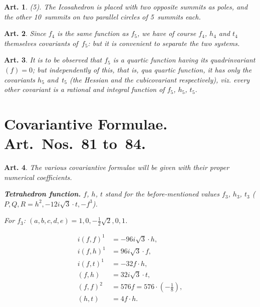 \documentclass[11pt,a4paper]{article}
\theoremstyle{plain}
\newtheorem{art}{Art.}[section]
\begin{document}
\begin{art}
(5). The Icosahedron is placed with two opposite summits as poles, and
the other 10~summits on two parallel circles of 5~summits each.
\end{art}

\begin{art}
Since $f_4$ is the same function as $f_5$, we have of course $f_4$, $h_4$ and
$t_4$ themselves covariants of~$f_5$: but it is convenient to separate the
two systems.
\end{art}

\begin{art}
It is to be observed that $f_5$ is a quartic function having its
quadrinvariant $(f) = 0$; but independently of this, that is, qua quartic
function, it has only the covariants $h_5$ and~$t_5$ (the Hessian and the
cubicovariant respectively), viz. every other covariant is a rational and
integral function of $f_5$, $h_5$, $t_5$.
\end{art}

\section*{Covariantive Formulae. Art.~Nos.~81 to~84.}

\begin{art}
The various covariantive formulae will be given with their proper
numerical coefficients.

\textbf{Tetrahedron function.} $f$, $h$, $t$ stand for the before-mentioned
values $f_3$, $h_3$, $t_3$ ($P, Q, R = h^2, -12i\sqrt{3} \cdot t, -f^3$).

For $f_3$: $(a, b, c, d, e) = 1, 0, -\frac{1}{2}\sqrt{2}, 0, 1$.

\begin{align*}
i(f,f)^1 &= -96i\sqrt{3} \cdot h, \\
i(f,h)^1 &= 96i\sqrt{3} \cdot f, \\
i(f,t)^1 &= -32f\cdot h, \\
(f,h) &= 32i\sqrt{3} \cdot t, \\
(f,f)^2 &= 576f = 576 \cdot (-\frac{1}{8}), \\
(h,t) &= 4f\cdot h.
\end{align*}
\end{art}
\end{document}
